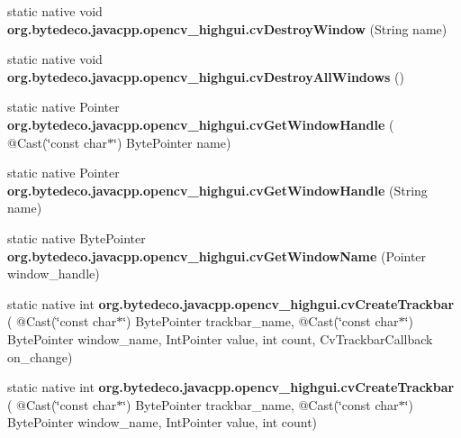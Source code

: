 \begin{DoxyCompactItemize}
\item 
\mbox{\label{group__highgui__c_ga3385f83fc06dbc2eb5355b61da754cf9}} 
static native void {\bfseries org.\+bytedeco.\+javacpp.\+opencv\+\_\+highgui.\+cv\+Destroy\+Window} (String name)
\item 
\mbox{\label{group__highgui__c_ga2d707e8a2fc727b1fbff227e7d7a4071}} 
static native void {\bfseries org.\+bytedeco.\+javacpp.\+opencv\+\_\+highgui.\+cv\+Destroy\+All\+Windows} ()
\item 
\mbox{\label{group__highgui__c_ga15ae6c4da4629b340895ee21d28738f2}} 
static native Pointer {\bfseries org.\+bytedeco.\+javacpp.\+opencv\+\_\+highgui.\+cv\+Get\+Window\+Handle} ( @Cast(\char`\"{}const char$\ast$\char`\"{}) Byte\+Pointer name)
\item 
\mbox{\label{group__highgui__c_ga56ef641c227a4e917db8b96aeecb4c09}} 
static native Pointer {\bfseries org.\+bytedeco.\+javacpp.\+opencv\+\_\+highgui.\+cv\+Get\+Window\+Handle} (String name)
\item 
\mbox{\label{group__highgui__c_ga9cc73415c9ea6b634e7bfad54d0c958a}} 
static native Byte\+Pointer {\bfseries org.\+bytedeco.\+javacpp.\+opencv\+\_\+highgui.\+cv\+Get\+Window\+Name} (Pointer window\+\_\+handle)
\item 
\mbox{\label{group__highgui__c_ga55d5eeaf81e13aee84080866b67a8803}} 
static native int {\bfseries org.\+bytedeco.\+javacpp.\+opencv\+\_\+highgui.\+cv\+Create\+Trackbar} ( @Cast(\char`\"{}const char$\ast$\char`\"{}) Byte\+Pointer trackbar\+\_\+name, @Cast(\char`\"{}const char$\ast$\char`\"{}) Byte\+Pointer window\+\_\+name, Int\+Pointer value, int count, Cv\+Trackbar\+Callback on\+\_\+change)
\item 
\mbox{\label{group__highgui__c_gae05927df2e0df0b07163fa8578e80328}} 
static native int {\bfseries org.\+bytedeco.\+javacpp.\+opencv\+\_\+highgui.\+cv\+Create\+Trackbar} ( @Cast(\char`\"{}const char$\ast$\char`\"{}) Byte\+Pointer trackbar\+\_\+name, @Cast(\char`\"{}const char$\ast$\char`\"{}) Byte\+Pointer window\+\_\+name, Int\+Pointer value, int count)
\item 
\mbox{\label{group__highgui__c_gaa0d64af00452517f939a7a4f4193b41f}} 

\end{DoxyCompactItemize}
